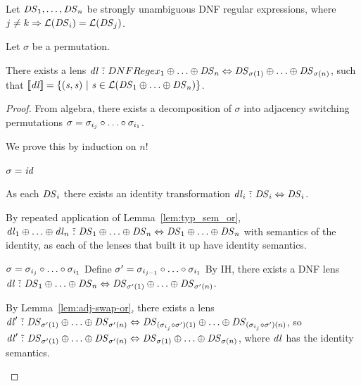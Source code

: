 \documentclass[acmsmall]{acmart}
\begin{document}
\begin{lemma}
  \label{lem:perm-or}
  Let $\mathit{DS}_1,\ldots,\mathit{DS}_n$ be strongly unambiguous DNF regular
  expressions, where $j \neq k \Rightarrow
  \mathcal{L}(\mathit{DS}_i) = \mathcal{L}(\mathit{DS}_j)$.

  Let $\sigma$ be a permutation.

  There exists a lens $\mathit{dl} \,\,\tilde{:}\,\, DNFRegex_1 \oplus \ldots
  \oplus \mathit{DS}_n \Leftrightarrow \mathit{DS}_{\sigma(1)} \oplus \ldots
  \oplus \mathit{DS}_{\sigma(n)}$, such that $[ \! [\mathit{dl}] \! ] =
  \{(\mathit{s},\mathit{s}) ~|~ \mathit{s} \in \mathcal{L}(\mathit{DS}_1 \oplus
      \ldots \oplus \mathit{DS}_n)\}$.
\end{lemma}
\begin{proof}
  From algebra, there exists a decomposition of $\sigma$ into adjacency
  switching permutations $\sigma = \sigma_{i_j} \circ \ldots \circ
  \sigma_{i_1}$.

  We prove this by induction on $n$!

  \begin{case}[$j=0$]
    $\sigma = \mathit{id}$

    As each $\mathit{DS}_i$ there exists an identity transformation
    $\mathit{dl}_i \,\,\tilde{:}\,\, \mathit{DS}_i \Leftrightarrow \mathit{DS}_i$.

    By repeated application of
    Lemma~\ref{lem:typ_sem_or},
    $\mathit{dl}_1 \oplus \ldots \oplus \mathit{dl}_n \,\,\tilde{:}\,\,
    \mathit{DS}_1 \oplus \ldots \oplus \mathit{DS}_n \Leftrightarrow
    \mathit{DS}_1 \oplus \ldots \oplus \mathit{DS}_n$ with semantics of the
    identity, as each of the lenses that built it up have identity semantics.
  \end{case}

  \begin{case}[$j>0$]
    $\sigma = \sigma_{i_j} \circ \ldots \circ \sigma_{i_1}$
    Define $\sigma' = \sigma_{i_{j-1}} \circ \ldots \circ \sigma_{i_1}$
    By IH, there exists a DNF lens
    $\mathit{dl} \,\,\tilde{:}\,\,
    \mathit{DS}_1 \oplus \ldots \oplus \mathit{DS}_n
    \Leftrightarrow
    \mathit{DS}_{\sigma'(1)} \oplus \ldots \oplus \mathit{DS}_{\sigma'(n)}$.

    By Lemma~\ref{lem:adj-swap-or}, there exists a lens
    $\mathit{dl}' \,\,\tilde{:}\,\,
    \mathit{DS}_{\sigma'(1)} \oplus \ldots \oplus \mathit{DS}_{\sigma'(n)}
    \Leftrightarrow
    \mathit{DS}_{(\sigma_{i_j} \circ \sigma')(1)} \oplus \ldots \oplus
    \mathit{DS}_{(\sigma_{i_j} \circ \sigma')(n)}$,
    so 
    $\mathit{dl}' \,\,\tilde{:}\,\,
    \mathit{DS}_{\sigma'(1)} \oplus \ldots \oplus \mathit{DS}_{\sigma'(n)}
    \Leftrightarrow
    \mathit{DS}_{\sigma(1)} \oplus \ldots \oplus \mathit{DS}_{\sigma(n)}$, where
    $\mathit{dl}$ has the identity semantics.


\end{case}
\end{proof}
\end{document}

